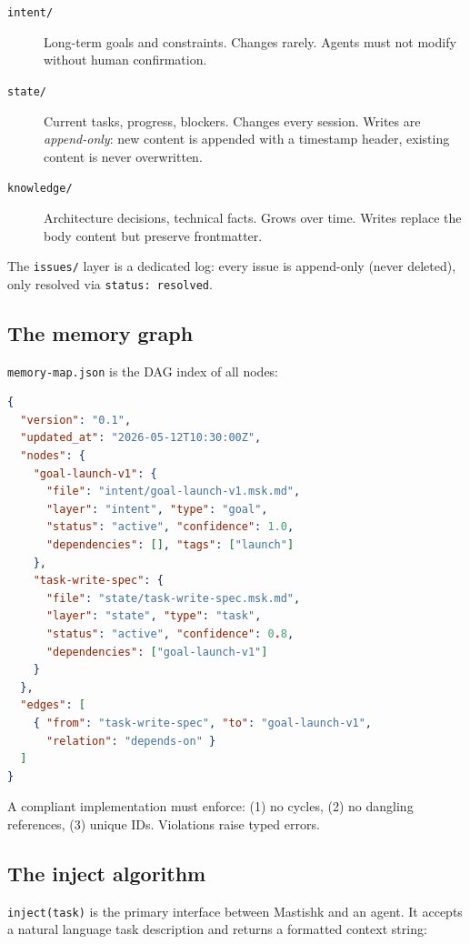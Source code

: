 \documentclass[11pt]{article}
\begin{document}
\begin{description}
  \item[\texttt{intent/}] Long-term goals and constraints. Changes rarely. Agents must not modify without human confirmation.
  \item[\texttt{state/}] Current tasks, progress, blockers. Changes every session. Writes are \emph{append-only}: new content is appended with a timestamp header, existing content is never overwritten.
  \item[\texttt{knowledge/}] Architecture decisions, technical facts. Grows over time. Writes replace the body content but preserve frontmatter.
\end{description}

The \texttt{issues/} layer is a dedicated log: every issue is append-only (never deleted), only resolved via \texttt{status: resolved}.

\subsection{The memory graph}

\texttt{memory-map.json} is the DAG index of all nodes:

\begin{lstlisting}[language=json]
{
  "version": "0.1",
  "updated_at": "2026-05-12T10:30:00Z",
  "nodes": {
    "goal-launch-v1": {
      "file": "intent/goal-launch-v1.msk.md",
      "layer": "intent", "type": "goal",
      "status": "active", "confidence": 1.0,
      "dependencies": [], "tags": ["launch"]
    },
    "task-write-spec": {
      "file": "state/task-write-spec.msk.md",
      "layer": "state", "type": "task",
      "status": "active", "confidence": 0.8,
      "dependencies": ["goal-launch-v1"]
    }
  },
  "edges": [
    { "from": "task-write-spec", "to": "goal-launch-v1",
      "relation": "depends-on" }
  ]
}
\end{lstlisting}

A compliant implementation must enforce: (1) no cycles, (2) no dangling references, (3) unique IDs. Violations raise typed errors.

\subsection{The inject algorithm}

\texttt{inject(task)} is the primary interface between Mastishk and an agent. It accepts a natural language task description and returns a formatted context string:
\end{document}
